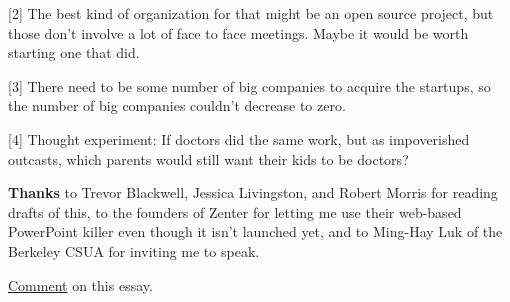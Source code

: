 [2] The best kind of organization for that might be an open
                    source project, but those don't involve a lot of face to
                    face meetings. Maybe it would be worth starting one that
                    did.

[3] There need to be some number of big companies to acquire
                    the startups, so the number of big companies couldn't
                    decrease to zero.

[4] Thought experiment: If doctors did the same work, but as
                    impoverished outcasts, which parents would still want their
                    kids to be doctors?

\textbf{Thanks} to Trevor
                    Blackwell, Jessica Livingston, and Robert Morris for reading
                    drafts of this, to the founders of Zenter for letting me use
                    their web-based PowerPoint killer even though it isn't
                    launched yet, and to Ming-Hay Luk of the Berkeley CSUA for
                    inviting me to speak.




                    \href{http://news.ycombinator.com/comments?id=6668}{Comment}
                    on this essay.



              
            
          
